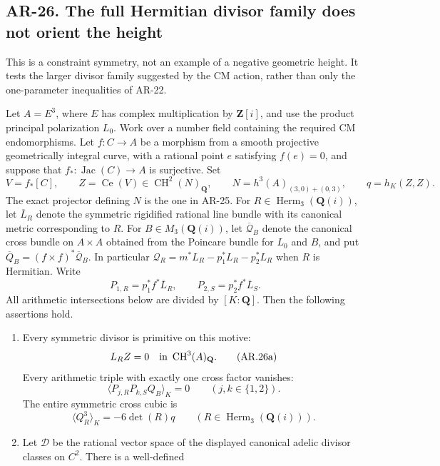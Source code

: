 \subsection*{AR-26. The full Hermitian divisor family does not orient the height}

This is a constraint symmetry, not an example of a negative geometric
height.  It tests the larger divisor family suggested by the CM action,
rather than only the one-parameter inequalities of AR-22.

\begin{proposition}[AR-26]
Let $A=E^3$, where $E$ has complex multiplication by $\mathbf Z[i]$,
and use the product principal polarization $L_0$.  Work over a number
field containing the required CM endomorphisms.  Let $f:C\to A$ be a
morphism from a smooth projective geometrically integral curve, with
a rational point $e$ satisfying $f(e)=0$, and suppose that
$f_*:\operatorname{Jac}(C)\to A$ is surjective.  Set
\[
 V=f_*[C],\qquad Z=\operatorname{Ce}(V)\in
 \operatorname{CH}^2(N)_\mathbf Q,
 \qquad N=h^3(A)_{(3,0)+(0,3)},\qquad q=h_K(Z,Z).
\]
The exact projector defining $N$ is the one in AR-25.
For $R\in\operatorname{Herm}_3(\mathbf Q(i))$, let
$\overline L_R$ denote the symmetric rigidified rational line bundle
with its canonical metric corresponding to $R$.  For
$B\in M_3(\mathbf Q(i))$, let $\overline{\mathcal Q}_B$ denote the
canonical cross bundle on $A\times A$ obtained from the Poincare
bundle for $L_0$ and $B$, and put
$\overline Q_B=(f\times f)^*\overline{\mathcal Q}_B$.
In particular $\mathcal Q_R=m^*L_R-p_1^*L_R-p_2^*L_R$ when $R$
is Hermitian.  Write
\[
 P_{1,R}=p_1^*f^*\overline L_R,\qquad
 P_{2,S}=p_2^*f^*\overline L_S.
\]
All arithmetic intersections below are divided by $[K:\mathbf Q]$.
Then the following assertions hold.
\begin{enumerate}
\item Every symmetric divisor is primitive on this motive:
\[
 L_R Z=0\quad\hbox{in }\operatorname{CH}^3(A)_\mathbf Q.
                                                               \tag{AR.26a}
\]
Every arithmetic triple with exactly one cross factor vanishes:
\[
 \langle P_{j,R}P_{k,S}Q_B\rangle_K=0
 \qquad(j,k\in\{1,2\}).                                \tag{AR.26b}
\]
The entire symmetric cross cubic is
\[
 \langle Q_R^3\rangle_K=-6\det(R)q
 \qquad(R\in\operatorname{Herm}_3(\mathbf Q(i))).         \tag{AR.26c}
\]
\item Let $\mathcal D$ be the rational vector space of the displayed
canonical adelic divisor classes on $C^2$.  There is a well-defined

\end{enumerate}
\end{proposition}
